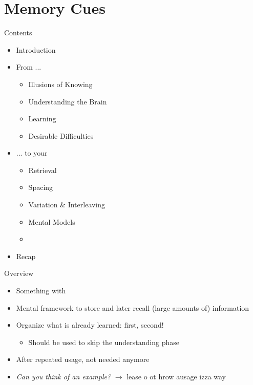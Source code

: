 \documentclass{ercisbeamer}
\begin{document}
\section{Memory Cues}
\begin{frame}{Contents}
    \begin{itemize}
        \item Introduction
        \item From ...
        \begin{itemize}
            \item Illusions of Knowing
            \item Understanding the Brain
            \item Learning
            \item Desirable Difficulties
        \end{itemize}
        \item ... to your 
        \begin{itemize}
            \item Retrieval
            \item Spacing
            \item Variation \& Interleaving
            \item Mental Models
            \item {}
        \end{itemize}
        \item Recap
    \end{itemize}
\end{frame}

\begin{frame}{Overview}
    \begin{tbox}
        \begin{itemize}
            \item Something with 
            \item Mental framework to store and later recall (large amounts of) information
            \item Organize what is already learned:  first,  second!
            \begin{itemize}
                \item Should  be used to skip the understanding phase
            \end{itemize} 
            \item After repeated usage, not needed anymore
            \item \emph{Can you think of an example?} \pause
            $\rightarrow$ lease o ot hrow ausage izza way 
        \end{itemize}
    \end{tbox}
\end{frame}
\setbgimage{}
\end{document}
